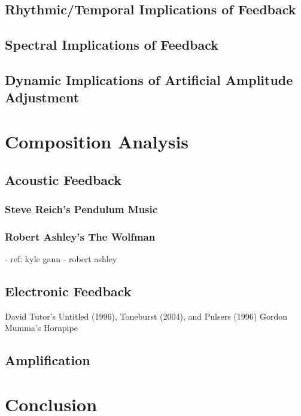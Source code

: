 \documentclass[titlepage]{scrartcl}
\begin{document}
    \subsection{Rhythmic/Temporal Implications of Feedback}
    \subsection{Spectral Implications of Feedback}
    \subsection{Dynamic Implications of Artificial Amplitude Adjustment}

    \section{Composition Analysis}
    \subsection{Acoustic Feedback}
    \subsubsection{Steve Reich's Pendulum Music}\label{pendulum}
    \subsubsection{Robert Ashley's The Wolfman}\label{wolfman}
    - ref: kyle gann - robert ashley

    \subsection{Electronic Feedback}\label{ElecFeed}
        David Tutor's Untitled (1996), Toneburst (2004), and Pulsers (1996)
        Gordon Mumma's Hornpipe

        \subsection{Amplification}\label{amp}

    \section{Conclusion}

    \printbibliography
\end{document}
